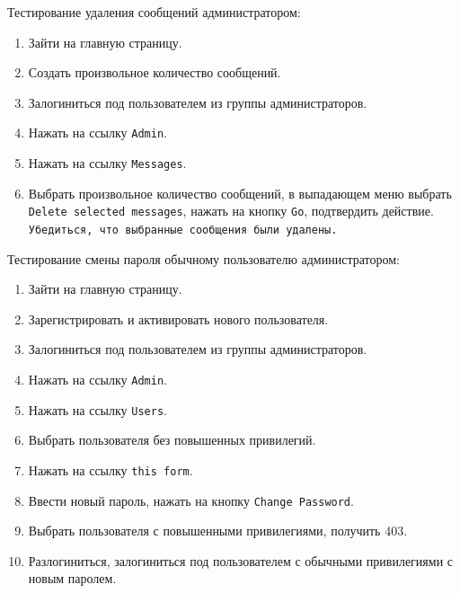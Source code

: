 \documentclass[oneside, final, 14pt]{extarticle}
\begin{document}
\vspace{0.5cm}

Тестирование удаления сообщений администратором:

\begin{enumerate}
\item{Зайти на главную страницу.}
\item{Создать произвольное количество сообщений.}
\item{Залогиниться под пользователем из группы администраторов.}
\item{Нажать на ссылку \texttt{Admin}.}
\item{Нажать на ссылку \texttt{Messages}.}
\item{Выбрать произвольное количество сообщений, в выпадающем меню выбрать \texttt{Delete selected messages}, нажать на кнопку \texttt{Go}, подтвердить действие.}
\texttt{Убедиться, что выбранные сообщения были удалены.}
\end{enumerate}

\vspace{0.5cm}

Тестирование смены пароля обычному пользователю администратором:

\begin{enumerate}
\item{Зайти на главную страницу.}
\item{Зарегистрировать и активировать нового пользователя.}
\item{Залогиниться под пользователем из группы администраторов.}
\item{Нажать на ссылку \texttt{Admin}.}
\item{Нажать на ссылку \texttt{Users}.}
\item{Выбрать пользователя без повышенных привилегий.}
\item{Нажать на ссылку \texttt{this form}.}
\item{Ввести новый пароль, нажать на кнопку \texttt{Change Password}.}
\item{Выбрать пользователя с повышенными привилегиями, получить 403.}
\item{Разлогиниться, залогиниться под пользователем с обычными привилегиями с новым паролем.}
\end{enumerate}
\end{document}
